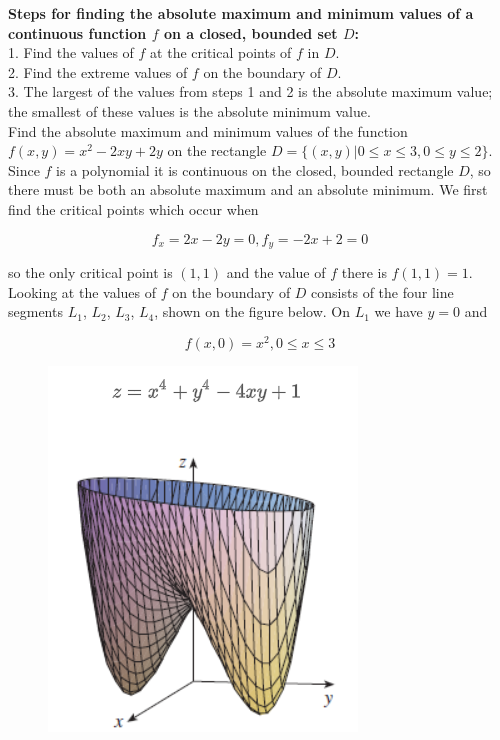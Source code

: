         \textbf{Steps for finding the absolute maximum and minimum values of a continuous function $f$ on a closed, bounded set $D$:} \\
        1. Find the values of $f$ at the critical points of $f$ in $D$. \\
        2. Find the extreme values of $f$ on the boundary of $D$. \\
        3. The largest of the values from steps 1 and 2 is the absolute maximum value; the smallest of these values is the absolute minimum value. \\

        \textit{} Find the absolute maximum and minimum values of the function $f(x,y) = x^2 - 2xy + 2y$ on the rectangle $D = \{(x,y) | 0\leq x \leq 3, 0 \leq y \leq 2\}$. \\

        Since $f$ is a polynomial it is continuous on the closed, bounded rectangle $D$, so there must be both an absolute maximum and an absolute minimum. We first find the critical points which occur when

        \[
            f_x = 2x - 2y = 0, f_y = -2x + 2 = 0
        \]

        so the only critical point is $(1,1)$ and the value of $f$ there is $f(1,1) = 1$. Looking at the values of $f$ on the boundary of $D$ consists of the four line segments $L_1$, $L_2$, $L_3$, $L_4$, shown on the
        figure below. On $L_1$ we have $y=0$ and

        \[
            f(x,0) = x^2, 0 \leq x \leq 3
        \]

        \begin{figure}[hbt!]
            \centering
            \includegraphics[scale = 0.75]{Resources/14.7_Example_Graph}
        \end{figure}

